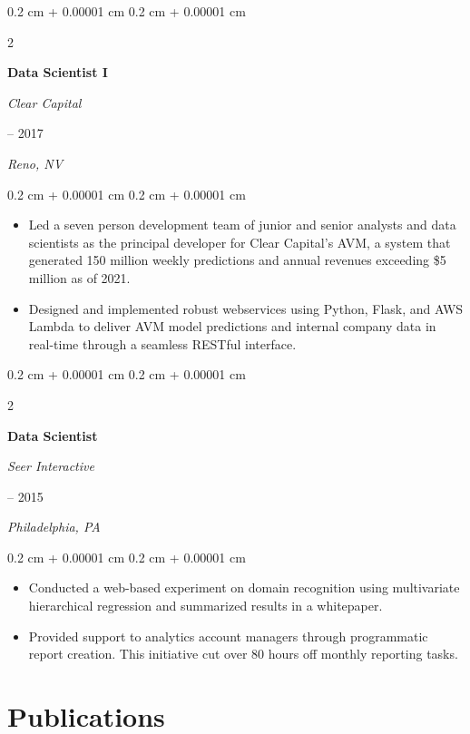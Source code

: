 \documentclass[11pt, letterpaper]{article}
\newenvironment{highlights}{
    \begin{itemize}[
        topsep=0.10 cm,
        parsep=0.10 cm,
        partopsep=0pt,
        itemsep=0pt,
        leftmargin=0.4 cm + 10pt
    ]
}{
    \end{itemize}
} %
\newenvironment{onecolentry}{
    \begin{adjustwidth}{
        0.2 cm + 0.00001 cm
    }{
        0.2 cm + 0.00001 cm
    }
}{
    \end{adjustwidth}
} %
\newenvironment{twocolentry}[2][]{
    \onecolentry
    \def\secondColumn{#2}
    \setcolumnwidth{\fill, 4.5 cm}
    \begin{paracol}{2}
}{
    \switchcolumn \raggedleft \secondColumn
    \end{paracol}
    \endonecolentry
} %
\begin{document}
\vspace{0.2 cm}
\begin{twocolentry}{
        2015 – 2017

        \textit{Reno, NV}
    }
    \textbf{Data Scientist I}

    \textit{Clear Capital}
\end{twocolentry}

\begin{onecolentry}
    \begin{highlights}

        \item Led a seven person development team of junior and senior analysts and data
        scientists as the principal developer for Clear Capital's AVM, a system that
        generated 150 million weekly predictions and annual revenues exceeding \$5
        million as of 2021.
        \item Designed and implemented robust webservices using Python, Flask, and
        AWS Lambda to deliver AVM model predictions and internal company data in
        real-time through a seamless RESTful interface.

    \end{highlights}
\end{onecolentry}


\vspace{0.2 cm}
\begin{twocolentry}{
        2014 – 2015

        \textit{Philadelphia, PA}
    }
    \textbf{Data Scientist}

    \textit{Seer Interactive}
\end{twocolentry}

\begin{onecolentry}
    \begin{highlights}

        \item Conducted a web-based experiment on domain recognition using multivariate
        hierarchical regression and summarized results in a whitepaper.
        \item Provided support to analytics account managers through programmatic report
        creation. This initiative cut over 80 hours oﬀ monthly reporting tasks.
    \end{highlights}
\end{onecolentry}


\section{Publications}
\end{document}
